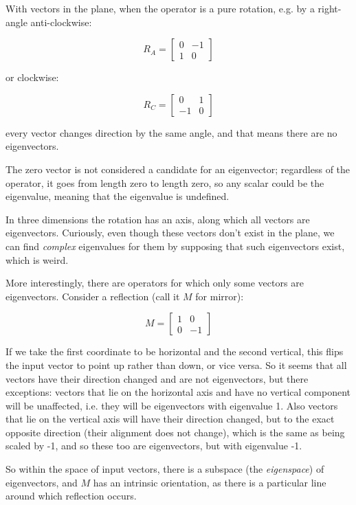With vectors in the plane, when the operator is a pure rotation, e.g. by a right-angle anti-clockwise:

$$R_A = \begin{bmatrix}0 & -1 \\ 1 & 0\end{bmatrix}$$

or clockwise:

$$R_C = \begin{bmatrix}0 & 1 \\ -1 & 0\end{bmatrix}$$

every vector changes direction by the same angle, and that means there are no eigenvectors.

The zero vector is not considered a candidate for an eigenvector; regardless of the operator, it goes from length zero to length zero, so any scalar could be the eigenvalue, meaning that the eigenvalue is undefined.

In three dimensions the rotation has an axis, along which all vectors are eigenvectors. Curiously, even though these vectors don't exist in the plane, we can find \textit{complex} eigenvalues for them by supposing that such eigenvectors exist, which is weird.

More interestingly, there are operators for which only some vectors are eigenvectors. Consider a reflection (call it $M$ for mirror):

$$M = \begin{bmatrix}1 & 0 \\ 0 & -1\end{bmatrix}$$

If we take the first coordinate to be horizontal and the second vertical, this flips the input vector to point up rather than down, or vice versa. So it seems that all vectors have their direction changed and are not eigenvectors, but there exceptions: vectors that lie on the horizontal axis and have no vertical component will be unaffected, i.e. they will be eigenvectors with eigenvalue 1. Also vectors that lie on the vertical axis will have their direction changed, but to the exact opposite direction (their alignment does not change), which is the same as being scaled by -1, and so these too are eigenvectors, but with eigenvalue -1.

So within the space of input vectors, there is a subspace (the \textit{eigenspace}) of eigenvectors, and $M$ has an intrinsic orientation, as there is a particular line around which reflection occurs.

